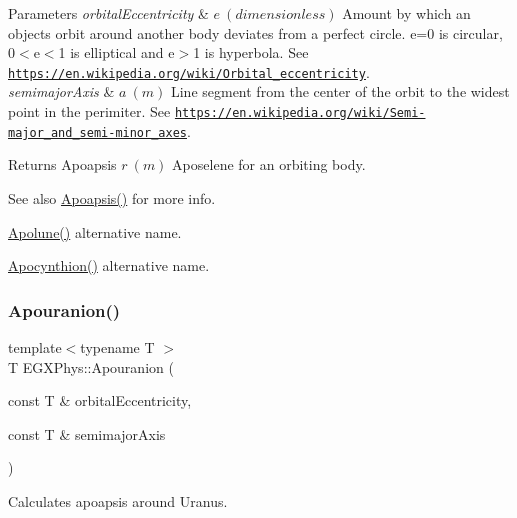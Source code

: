 \begin{DoxyParams}{Parameters}
{\em orbital\+Eccentricity} & $ e\ (dimensionless)$ Amount by which an objects orbit around another body deviates from a perfect circle. e=0 is circular, 0$<$e$<$1 is elliptical and e$>$1 is hyperbola. See \href{https://en.wikipedia.org/wiki/Orbital_eccentricity}{\tt https\+://en.\+wikipedia.\+org/wiki/\+Orbital\+\_\+eccentricity}. \\
\hline
{\em semimajor\+Axis} & $ a\ (m)$ Line segment from the center of the orbit to the widest point in the perimiter. See \href{https://en.wikipedia.org/wiki/Semi-major_and_semi-minor_axes}{\tt https\+://en.\+wikipedia.\+org/wiki/\+Semi-\/major\+\_\+and\+\_\+semi-\/minor\+\_\+axes}. \\
\hline
\end{DoxyParams}
\begin{DoxyReturn}{Returns}
Apoapsis $ r\ (m)$ Aposelene for an orbiting body. 
\end{DoxyReturn}
\begin{DoxySeeAlso}{See also}
\mbox{\hyperlink{group___e_g_x_phys-_apoapsis_gaf962e650bf84a568458e8eb39b1c61ba}{Apoapsis()}} for more info. 

\mbox{\hyperlink{group___e_g_x_phys-_apoapsis_gacc68b49812c38394611e1ef3a8bf0e3e}{Apolune()}} alternative name. 

\mbox{\hyperlink{group___e_g_x_phys-_apoapsis_ga557bb4d1a0ce7f17aaa8f8de469d4f52}{Apocynthion()}} alternative name. 
\end{DoxySeeAlso}
\mbox{\label{group___e_g_x_phys-_apoapsis_ga6efaf5c9379f1085fa6e51bf97356124}} 
\subsubsection{\texorpdfstring{Apouranion()}{Apouranion()}}
{\footnotesize\ttfamily template$<$typename T $>$ \\
T E\+G\+X\+Phys\+::\+Apouranion (\begin{DoxyParamCaption}\item[{const T \&}]{orbital\+Eccentricity,  }\item[{const T \&}]{semimajor\+Axis }\end{DoxyParamCaption})}



Calculates apoapsis around Uranus. 


